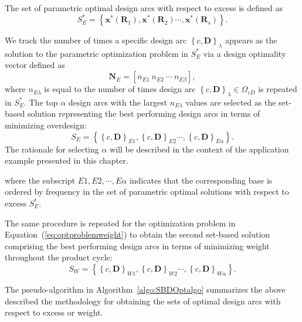 The set of parametric optimal design arcs with respect to excess is defined as
%
\begin{equation} \label{eq:SBDexcessopt}
	S_E^* = \left\{\mathbf{x}^*(\mathbf{R}_1),\mathbf{x}^*(\mathbf{R}_2)\cdots,\mathbf{x}^*(\mathbf{R}_s)\right\}.
\end{equation}

We track the number of times a specific design arc $\left\{c,\mathbf{D}\right\}_\lambda$ appears as the solution to the parametric optimization problem in $S_E^*$ via a design optimality vector defined as
%
\begin{equation} \label{eq:optimalityvec}
	\mathbf{N}_E = \left[n_{E1} ~ n_{E2} ~ \cdots ~ n_{E\beta}\right],%
\end{equation}
%
where $n_{E\lambda}$ is equal to the number of times design arc $\left\{c,\mathbf{D}\right\}_\lambda \in \Omega_{cD}$ is repeated in $S_E^*$. The top $\alpha$ design arcs with the largest $n_{E\lambda}$ values are selected as the set-based solution representing the best performing design arcs in terms of minimizing overdesign:
%
\begin{equation} \label{eq:SBDexcess}
	S_E = \left\{\left\{c,\mathbf{D}\right\}_{E1},\left\{c,\mathbf{D}\right\}_{E2}\cdots,\left\{c,\mathbf{D}\right\}_{E\alpha}\right\}.
\end{equation}
%
The rationale for selecting $\alpha$ will be described in the context of the application example presented in this chapter.

where the subscript $E1,E2,\cdots,E\alpha$ indicates that the corresponding base is ordered by frequency in the set of parametric optimal solutions with respect to excess $S_E^*$.

The same procedure is repeated for the optimization problem in Equation~(\ref{eq:optproblemweight}) to obtain the second set-based solution comprising the best performing design arcs in terms of minimizing weight throughout the product cycle:
%
\begin{equation} \label{eq:SBDweight}
	S_W = \left\{\left\{c,\mathbf{D}\right\}_{W1},\left\{c,\mathbf{D}\right\}_{W2}\cdots,\left\{c,\mathbf{D}\right\}_{W\alpha}\right\}.
\end{equation}

The pseudo-algorithm in Algorithm~\ref{algo:SBDOptalgo} summarizes the above described the methodology for obtaining the sets of optimal design arcs with respect to excess or weight.

